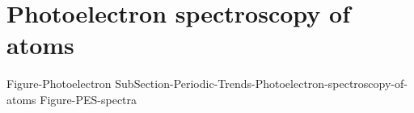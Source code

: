 \documentclass[main.tex]{subfiles}
\newcommand\chapterlabel{Ch-radiation}\setcounter{figurenewcounter}{0}\setcounter{tablenewcounter}{0}\setcounter{formulanewcounter}{0}\chapterpicture{../{\chapterlabel}/figure1}\chapterpicturelabel{PngImg}
\begin{document}
\section{Photoelectron spectroscopy of atoms}
{Figure-Photoelectron}%
{SubSection-Periodic-Trends-Photoelectron-spectroscopy-of-atoms}%
{Figure-PES-spectra}%
\newpage









 \checkoddpage\ifoddpage \clearpage\thispagestyle{empty}\mbox{}\clearpage \else  \fi 
\end{document}

